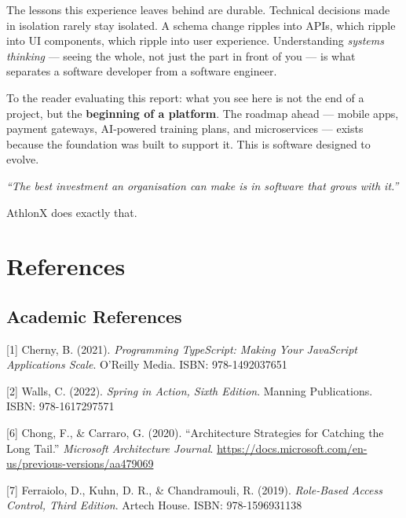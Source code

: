 \documentclass[
  12pt,
  a4paperpaper,
]{report}
\begin{document}
\noindent
The lessons this experience leaves behind are durable. Technical decisions made in isolation rarely stay isolated. A schema change ripples into APIs, which ripple into UI components, which ripple into user experience. Understanding \textit{systems thinking} --- seeing the whole, not just the part in front of you --- is what separates a software developer from a software engineer.

\vspace{0.4cm}

\noindent
To the reader evaluating this report: what you see here is not the end of a project, but the \textbf{beginning of a platform}. The roadmap ahead --- mobile apps, payment gateways, AI-powered training plans, and microservices --- exists because the foundation was built to support it. This is software designed to evolve.

\vspace{0.4cm}

\begin{center}
\textit{``The best investment an organisation can make is in software that grows with it.''}
\end{center}

\vspace{0.3cm}

\noindent
AthlonX does exactly that.

\clearpage


\chapter{References}\label{references}

\section{Academic References}\label{academic-references}

{[}1{]} Cherny, B. (2021). \emph{Programming TypeScript: Making Your
JavaScript Applications Scale}. O'Reilly Media. ISBN: 978-1492037651

{[}2{]} Walls, C. (2022). \emph{Spring in Action, Sixth Edition}.
Manning Publications. ISBN: 978-1617297571

{[}6{]} Chong, F., \& Carraro, G. (2020). ``Architecture Strategies for
Catching the Long Tail.'' \emph{Microsoft Architecture Journal}.
\url{https://docs.microsoft.com/en-us/previous-versions/aa479069}

{[}7{]} Ferraiolo, D., Kuhn, D. R., \& Chandramouli, R. (2019).
\emph{Role-Based Access Control, Third Edition}. Artech House. ISBN:
978-1596931138
\end{document}
